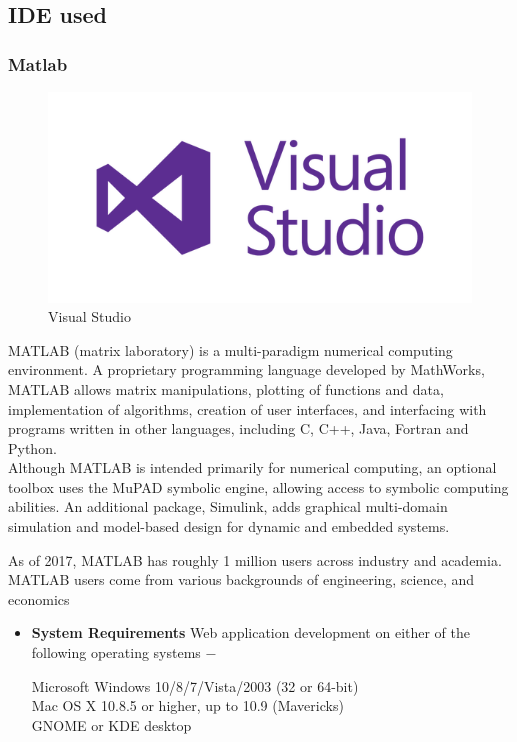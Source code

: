 \subsection{IDE used}
\subsubsection{Matlab}

\begin{figure}[ht]
\centering
\includegraphics[scale=0.90]{images/VisualStudio.png}
\caption{Visual Studio}
\end{figure}

MATLAB (matrix laboratory) is a multi-paradigm numerical computing environment. A proprietary programming language developed by MathWorks, MATLAB allows matrix manipulations, plotting of functions and data, implementation of algorithms, creation of user interfaces, and interfacing with programs written in other languages, including C, C++, Java, Fortran and Python.\\
Although MATLAB is intended primarily for numerical computing, an optional toolbox uses the MuPAD symbolic engine, allowing access to symbolic computing abilities. An additional package, Simulink, adds graphical multi-domain simulation and model-based design for dynamic and embedded systems.

As of 2017, MATLAB has roughly 1 million users across industry and academia. MATLAB users come from various backgrounds of engineering, science, and economics





\begin{itemize}
\item \textbf{System Requirements}
Web application development on either of the following operating systems −
\vskip 0.1in

Microsoft Windows 10/8/7/Vista/2003 (32 or 64-bit)
\\Mac OS X 10.8.5 or higher, up to 10.9 (Mavericks)
\\GNOME or KDE desktop
\vskip 0.1in

\end{itemize}

